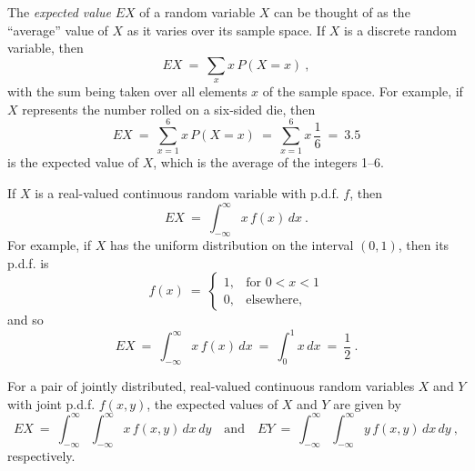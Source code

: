 The \emph{expected value} $EX$ of a random variable $X$ can be thought of as the ``average'' value of $X$ as it varies
over its sample space. If $X$ is a discrete random variable, then
\begin{equation}
 EX ~=~ \sum\limits_{x} x\,P(X=x)~,
\end{equation}
with the sum being taken over all elements $x$ of the sample space. For example, if $X$ represents the number rolled on
a six-sided die, then
\begin{equation}
 EX ~=~ \sum\limits_{x=1}^6 x\,P(X=x) ~=~ \sum\limits_{x=1}^6 x\,\frac{1}{6} ~=~ 3.5
\end{equation}
is the expected value of $X$, which is the average of the integers 1--6.

If $X$ is a real-valued continuous random variable with p.d.f. $f$, then
\begin{equation}
 EX ~=~ \int_{-\infty}^{\infty} x\,f(x)\,dx ~.
\end{equation}
For example, if $X$ has the uniform distribution on the interval $(0,1)$, then its p.d.f. is
\begin{equation}
 f(x) ~=~ \begin{cases}
  1, &\text{for $0 < x < 1$}\\
   0, &\text{elsewhere,}
 \end{cases}
\end{equation}
and so
\begin{equation}
 EX ~=~ \int_{-\infty}^{\infty} x\,f(x)\,dx ~=~ \int_0^1 x\,dx ~=~ \frac{1}{2} ~.
\end{equation}

For a pair of jointly distributed, real-valued continuous random variables $X$ and $Y$ with joint p.d.f. $f(x,y)$, the
expected values of $X$ and $Y$ are given by
\begin{equation}
 EX ~=~ \int_{-\infty}^{\infty} \int_{-\infty}^{\infty} x\,f(x,y)\,dx\,dy \quad\text{and}\quad
 EY ~=~ \int_{-\infty}^{\infty} \int_{-\infty}^{\infty} y\,f(x,y)\,dx\,dy ~,
\end{equation}
respectively.

